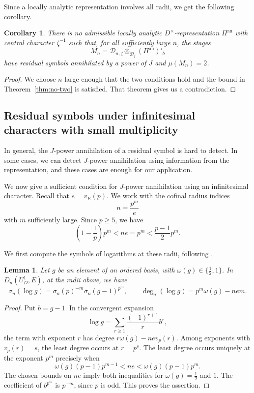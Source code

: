 \documentclass[11pt]{article}
\newtheorem{lemma}[theorem]{Lemma}
\newtheorem{corollary}[theorem]{Corollary}
\theoremstyle{definition}
\begin{document}
Since a locally analytic representation involves all radii, we get the following corollary.     
\begin{corollary}\label{cor:no-eventual-two}
There is no admissible locally analytic $D^\times$-representation
$\Pi^{\mathrm{an}}$ with central character $\zeta^{-1}$ such that,
for all sufficiently large $n$, the stages
\[
 M_n=\mathscr D_{n,\zeta}\otimes_{\mathscr D_\zeta}
           (\Pi^{\mathrm{an}})'_b
\]
have residual symbols annihilated by a power of $J$ and
$\mu(M_n)=2$.
\end{corollary}
\begin{proof}
We choose $n$ large enough that the two conditions hold and
the bound in Theorem~\ref{thm:no-two} is satisfied.
That theorem gives us a contradiction.
\end{proof}


\subsection{Residual symbols under infinitesimal characters with small multiplicity}
\label{sec:infinitesimal-geometric-two}
In general, the $J$-power annihilation of a residual symbol is hard to detect. 
In some cases, we can detect $J$-power annihilation using information from the representation, and these cases are enough for our application.

We now give a sufficient condition for $J$-power annihilation using an
infinitesimal character. Recall that $e=v_E(p)$. We work with the cofinal
radius indices
\[
 n=\frac{p^m}{e}
\]
with $m$ sufficiently large. Since $p\geq5$, we have
\[
 \left(1-\frac1p\right)p^m<ne=p^m<\frac{p-1}{2}p^m.
\]

We first compute the symbols of logarithms at these radii, following
\cite[Lemma~6.5]{Sorgdrager2026}.

\begin{lemma}\label{lem:cofinal-logarithm-symbol}
Let $g$ be an element of an ordered basis, with
$\omega(g)\in\{\tfrac12,1\}$. In $D_n(U_D^1,E)$, at the radii above, we have
\[
 \sigma_n(\log g)=\sigma_n(p)^{-m}\sigma_n(g-1)^{p^m},
 \qquad
 \deg_n(\log g)=p^m\omega(g)-ne m.
\]
\end{lemma}
\begin{proof}
Put $b=g-1$. In the convergent expansion
\[
 \log g=\sum_{r\geq1}\frac{(-1)^{r+1}}{r}b^r,
\]
the term with exponent $r$ has degree
$r\omega(g)-ne v_p(r)$. Among exponents with $v_p(r)=s$, the
least degree occurs at $r=p^s$. The least degree occurs uniquely at the exponent $p^m$
precisely when
\[
 \omega(g)(p-1)p^{m-1}<ne<\omega(g)(p-1)p^m.
\]
The chosen bounds on $ne$ imply both inequalities for
$\omega(g)=\tfrac12$ and $1$. The coefficient of $b^{p^m}$ is
$p^{-m}$, since $p$ is odd. This proves the assertion.
\end{proof}
\end{document}
